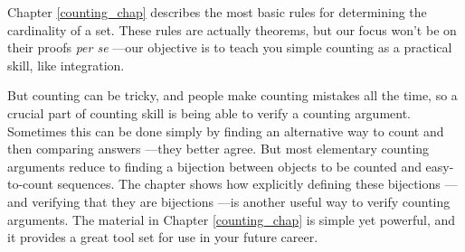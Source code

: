 \iffalse
In Chapter~\ref{chap:recurrences}, we show how to solve a variety of
recurrences that arise in computational problems.  These methods are
especially useful when you need to design or analyze recursive
programs.
\fi

Chapter \ref{counting_chap} describes the most basic rules for
determining the cardinality of a set.  These rules are actually
theorems, but our focus won't be on their proofs \emph{per se} ---our
objective is to teach you simple counting as a practical skill, like
integration.

But counting can be tricky, and people make counting mistakes all the
time, so a crucial part of counting skill is being able to verify a
counting argument.  Sometimes this can be done simply by finding an
alternative way to count and then comparing answers ---they better
agree.  But most elementary counting arguments reduce to finding a
bijection between objects to be counted and easy-to-count sequences.
The chapter shows how explicitly defining these bijections ---and
verifying that they are bijections ---is another useful way to verify
counting arguments.  The material in Chapter \ref{counting_chap} is
simple yet powerful, and it provides a great tool set for use in your
future career.


\iffalse
We conclude in Chapter~\ref{cardinality_chap} with a brief digression
into the final frontier of counting ---infinity.  We'll define what it
means for a set to be countable and show you some examples of sets
that are really big ---bigger even than the set of real numbers.
\fi

\endinput
